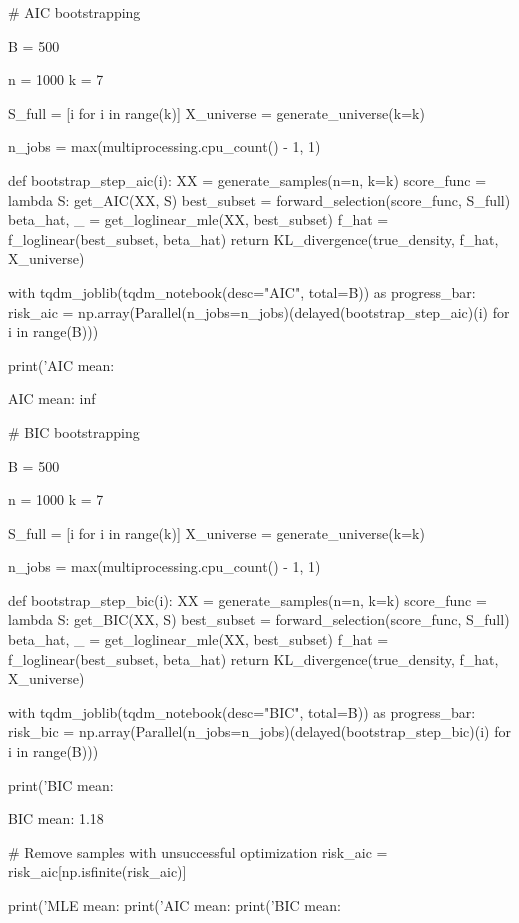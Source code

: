 \begin{python}
# AIC bootstrapping

B = 500

n = 1000
k = 7

S_full = [i for i in range(k)]
X_universe = generate_universe(k=k)

n_jobs = max(multiprocessing.cpu_count() - 1, 1)

def bootstrap_step_aic(i):
    XX = generate_samples(n=n, k=k)    
    score_func = lambda S: get_AIC(XX, S)
    best_subset = forward_selection(score_func, S_full)
    beta_hat, _ = get_loglinear_mle(XX, best_subset)
    f_hat = f_loglinear(best_subset, beta_hat)
    return KL_divergence(true_density, f_hat, X_universe)

with tqdm_joblib(tqdm_notebook(desc="AIC", total=B)) as progress_bar:
    risk_aic = np.array(Parallel(n_jobs=n_jobs)(delayed(bootstrap_step_aic)(i) for i in range(B)))

print('AIC mean: %
\end{python}

\begin{console}
AIC mean: inf
\end{console}

\begin{python}
# BIC bootstrapping

B = 500

n = 1000
k = 7

S_full = [i for i in range(k)]
X_universe = generate_universe(k=k)

n_jobs = max(multiprocessing.cpu_count() - 1, 1)

def bootstrap_step_bic(i):
    XX = generate_samples(n=n, k=k)    
    score_func = lambda S: get_BIC(XX, S)
    best_subset = forward_selection(score_func, S_full)
    beta_hat, _ = get_loglinear_mle(XX, best_subset)
    f_hat = f_loglinear(best_subset, beta_hat)
    return KL_divergence(true_density, f_hat, X_universe)

with tqdm_joblib(tqdm_notebook(desc="BIC", total=B)) as progress_bar:
    risk_bic = np.array(Parallel(n_jobs=n_jobs)(delayed(bootstrap_step_bic)(i) for i in range(B)))

print('BIC mean: %
\end{python}

\begin{console}
BIC mean: 1.18
\end{console}

\begin{python}
# Remove samples with unsuccessful optimization
risk_aic = risk_aic[np.isfinite(risk_aic)]

print('MLE mean: %
print('AIC mean: %
print('BIC mean: %
\end{python}

